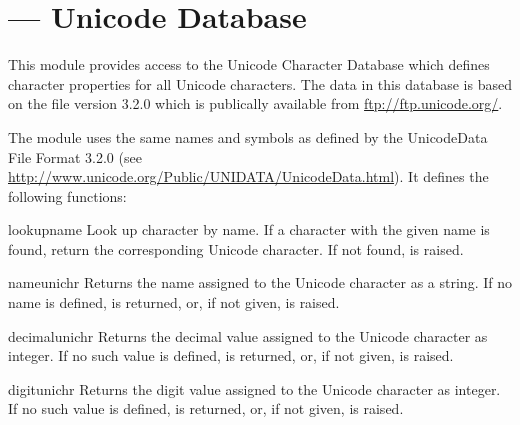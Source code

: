 \section{ ---
         Unicode Database}



This module provides access to the Unicode Character Database which
defines character properties for all Unicode characters. The data in
this database is based on the  file version
3.2.0 which is publically available from \url{ftp://ftp.unicode.org/}.

The module uses the same names and symbols as defined by the
UnicodeData File Format 3.2.0 (see
\url{http://www.unicode.org/Public/UNIDATA/UnicodeData.html}).  It
defines the following functions:

\begin{funcdesc}{lookup}{name}
  Look up character by name.  If a character with the
  given name is found, return the corresponding Unicode
  character.  If not found,  is raised.
\end{funcdesc}

\begin{funcdesc}{name}{unichr}
  Returns the name assigned to the Unicode character
   as a string. If no name is defined,
   is returned, or, if not given,
   is raised.
\end{funcdesc}

\begin{funcdesc}{decimal}{unichr}
  Returns the decimal value assigned to the Unicode character
   as integer. If no such value is defined,
   is returned, or, if not given,
   is raised.
\end{funcdesc}

\begin{funcdesc}{digit}{unichr}
  Returns the digit value assigned to the Unicode character
   as integer. If no such value is defined,
   is returned, or, if not given,
   is raised.
\end{funcdesc}

